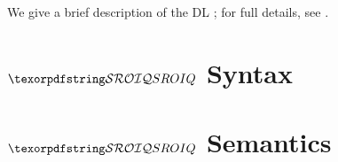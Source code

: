 
We give a brief description of the DL \SROIQ; for full details, see \cite{horrocks2006even,Kazakov08,baader_horrocks_lutz_sattler_2017}. 

\section{\texorpdfstring{$\SROIQ$}{SROIQ} Syntax} \label{sroiq-syntax-appendix}



\section{\texorpdfstring{$\SROIQ$}{SROIQ} Semantics} \label{sroiq-semantics-appendix}



